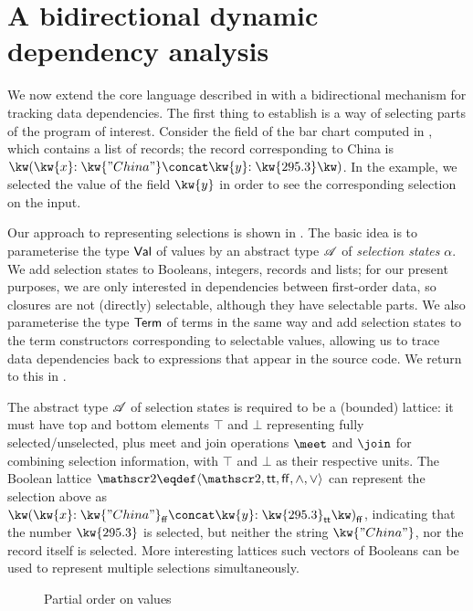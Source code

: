 \section{A bidirectional dynamic dependency analysis}
\label{sec:data-dependencies}

We now extend the core language described in  with a bidirectional mechanism for tracking data dependencies. The first thing to establish is a way of selecting parts of the program of interest. Consider the  field of the bar chart computed in , which contains a list of records; the record corresponding to China is $\exRec{\bind{\kw{x}}{\kw{"China"}} \concat \bind{\kw{y}}{\kw{295.3}}}$. In the example, we selected the value of the field $\kw{y}$ in order to see the corresponding selection on the input.

Our approach to representing selections is shown in . The basic idea is to parameterise the type $\textup{\textsf{Val}}$ of values by an abstract type $\mathscr{A}$ of \emph{selection states} $\alpha$. We add selection states to Booleans, integers, records and lists; for our present purposes, we are only interested in dependencies between first-order data, so closures are not (directly) selectable, although they have selectable parts. We also parameterise the type $\textup{\textsf{Term}}$ of terms in the same way and add selection states to the term constructors corresponding to selectable values, allowing us to trace data dependencies back to expressions that appear in the source code. We return to this in .



The abstract type $\mathscr{A}$ of selection states is required to be a (bounded) lattice: it must have top and bottom elements $\top$ and $\bot$ representing fully selected/unselected, plus meet and join operations $\meet$ and $\join$ for combining selection information, with $\top$ and $\bot$ as their respective units. The Boolean lattice $\Bool \eqdef \Lattice{\Bool}{\TT}{\FF}{\wedge}{\vee}$ can represent the selection above as $\annRec{\bind{\kw{x}}{\annStr{\kw{"China"}}{\FF}} \concat \bind{\kw{y}}{\annInt{\kw{295.3}}{\TT}}}{\FF}$, indicating that the number $\exInt{\kw{295.3}}$ is selected, but neither the string $\exStr{\kw{"China"}}$, nor the record itself is selected. More interesting lattices such vectors of Booleans can be used to represent multiple selections simultaneously.

\begin{figure}
   
   \caption{Partial order on values}
   \label{fig:data-dependencies:leq}
\end{figure}



